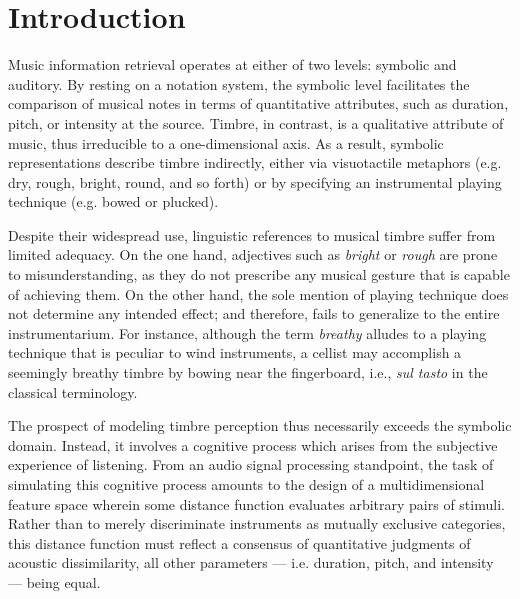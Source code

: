 \documentclass{bmcart}
\makeatletter
\newcommand*{\eg}{e.g.\@\xspace}
\newcommand*{\ie}{i.e.\@\xspace}
\makeatother
\begin{document}

\section*{Introduction}
\label{sec:intro}

Music information retrieval operates at either of two levels: symbolic and auditory.
By resting on a notation system, the symbolic level facilitates the comparison of musical notes in terms of quantitative attributes, such as duration, pitch, or intensity at the source.
Timbre, in contrast, is a qualitative attribute of music, thus irreducible to a one-dimensional axis.
As a result, symbolic representations describe timbre indirectly, either via visuotactile metaphors (\eg{} dry, rough, bright, round, and so forth) or by specifying an instrumental playing technique (\eg{} bowed or plucked).

Despite their widespread use, linguistic references to musical timbre suffer from limited adequacy.
On the one hand, adjectives such as \emph{bright} or \emph{rough} are prone to misunderstanding, as they do not prescribe any musical gesture that is capable of achieving them.
On the other hand, the sole mention of playing technique does not determine any intended effect; and therefore, fails to generalize to the entire instrumentarium.
For instance, although the term \emph{breathy} alludes to a playing technique that is peculiar to wind instruments, a cellist may accomplish a seemingly breathy timbre by bowing near the fingerboard, i.e., \emph{sul tasto} in the classical terminology.

The prospect of modeling timbre perception thus necessarily exceeds the symbolic domain.
Instead, it involves a cognitive process which arises from the subjective experience of listening.
From an audio signal processing standpoint, the task of simulating this cognitive process amounts to the design of a multidimensional feature space wherein some distance function evaluates arbitrary pairs of stimuli.
Rather than to merely discriminate instruments as mutually exclusive categories, this distance function must reflect a consensus of quantitative judgments of acoustic dissimilarity, all other parameters --- \ie{} duration, pitch, and intensity --- being equal.
\end{document}
